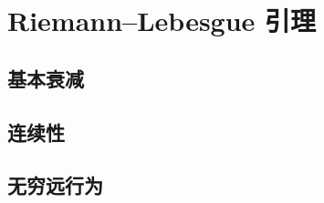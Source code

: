 \section{Riemann–Lebesgue 引理}
\label{b2:sec:0302}


\subsection{基本衰减}
\label{b2:subsec:030201}

\subsection{连续性}
\label{b2:subsec:030202}

\subsection{无穷远行为}
\label{b2:subsec:030203}



